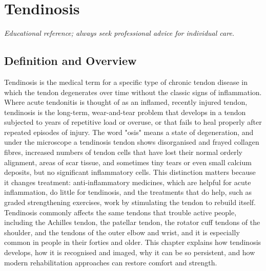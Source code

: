 \chapter{Tendinosis}

\medskip
\noindent\textit{Educational reference; always seek professional advice for individual care.}

\section*{Definition and Overview}
Tendinosis is the medical term for a specific type of chronic tendon disease in which the tendon degenerates over time without the classic signs of inflammation. Where acute tendonitis is thought of as an inflamed, recently injured tendon, tendinosis is the long-term, wear-and-tear problem that develops in a tendon subjected to years of repetitive load or overuse, or that fails to heal properly after repeated episodes of injury. The word "osis" means a state of degeneration, and under the microscope a tendinosis tendon shows disorganised and frayed collagen fibres, increased numbers of tendon cells that have lost their normal orderly alignment, areas of scar tissue, and sometimes tiny tears or even small calcium deposits, but no significant inflammatory cells. This distinction matters because it changes treatment: anti-inflammatory medicines, which are helpful for acute inflammation, do little for tendinosis, and the treatments that do help, such as graded strengthening exercises, work by stimulating the tendon to rebuild itself. Tendinosis commonly affects the same tendons that trouble active people, including the Achilles tendon, the patellar tendon, the rotator cuff tendons of the shoulder, and the tendons of the outer elbow and wrist, and it is especially common in people in their forties and older. This chapter explains how tendinosis develops, how it is recognised and imaged, why it can be so persistent, and how modern rehabilitation approaches can restore comfort and strength.

